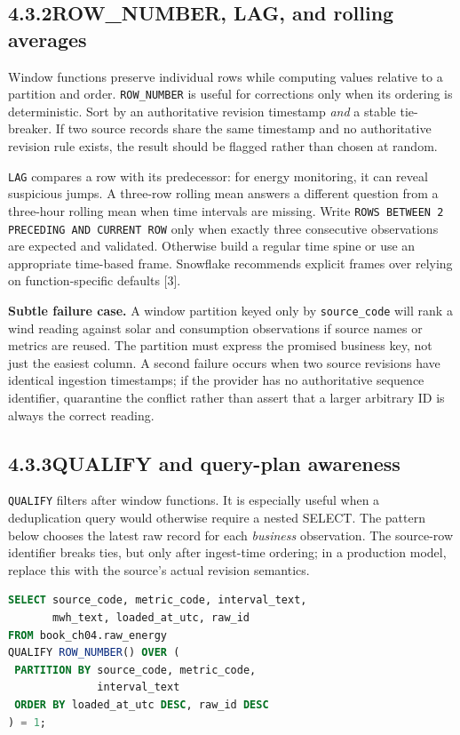 \documentclass[11pt,twoside]{article}
\newcommand{\topic}[2]{\subsection*{#1\quad #2}}
\begin{document}
\topic{4.3.2}{ROW\_NUMBER, LAG, and rolling averages}
Window functions preserve individual rows while computing values relative to a partition and order. \texttt{ROW\_NUMBER} is useful for corrections only when its ordering is deterministic. Sort by an authoritative revision timestamp \emph{and} a stable tie-breaker. If two source records share the same timestamp and no authoritative revision rule exists, the result should be flagged rather than chosen at random.

\texttt{LAG} compares a row with its predecessor: for energy monitoring, it can reveal suspicious jumps. A three-row rolling mean answers a different question from a three-hour rolling mean when time intervals are missing. Write \texttt{ROWS BETWEEN 2 PRECEDING AND CURRENT ROW} only when exactly three consecutive observations are expected and validated. Otherwise build a regular time spine or use an appropriate time-based frame. Snowflake recommends explicit frames over relying on function-specific defaults [3].


\textbf{Subtle failure case.} A window partition keyed only by \texttt{source\_code} will rank a wind reading against solar and consumption observations if source names or metrics are reused. The partition must express the promised business key, not just the easiest column. A second failure occurs when two source revisions have identical ingestion timestamps; if the provider has no authoritative sequence identifier, quarantine the conflict rather than assert that a larger arbitrary ID is always the correct reading.

\newpage
\topic{4.3.3}{QUALIFY and query-plan awareness}
\texttt{QUALIFY} filters after window functions. It is especially useful when a deduplication query would otherwise require a nested SELECT. The pattern below chooses the latest raw record for each \emph{business} observation. The source-row identifier breaks ties, but only after ingest-time ordering; in a production model, replace this with the source's actual revision semantics.

\begin{lstlisting}[language=SQL,caption={Deduplicate by observation key and deterministic order.}]
SELECT source_code, metric_code, interval_text,
       mwh_text, loaded_at_utc, raw_id
FROM book_ch04.raw_energy
QUALIFY ROW_NUMBER() OVER (
 PARTITION BY source_code, metric_code,
              interval_text
 ORDER BY loaded_at_utc DESC, raw_id DESC
) = 1;
\end{lstlisting}
\end{document}
